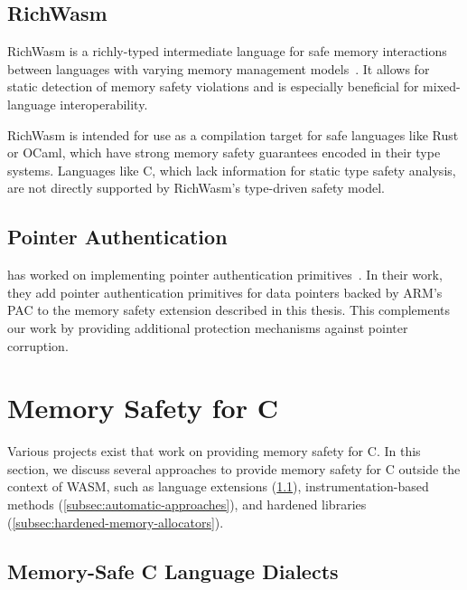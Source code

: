 \subsection{RichWasm}
\label{subsec:richwasm}

RichWasm is a richly-typed intermediate language for safe memory interactions between languages with varying memory management models~\cite{paraskevopoulou2024richwasm}.
It allows for static detection of memory safety violations and is especially beneficial for mixed-language interoperability.

RichWasm is intended for use as a compilation target for safe languages like Rust or OCaml, which have strong memory safety guarantees encoded in their type systems.
Languages like C, which lack information for static type safety analysis, are not directly supported by RichWasm's type-driven safety model.

\subsection{Pointer Authentication}
\label{subsec:related-pointer-authentication}

\citeauthor*{rehde2023wasm} has worked on implementing pointer authentication primitives~\cite{rehde2023wasm}.
In their work, they add pointer authentication primitives for data pointers backed by ARM's \ac{PAC} to the memory safety extension described in this thesis.
This complements our work by providing additional protection mechanisms against pointer corruption.

\section{Memory Safety for C}
\label{sec:related-memory-safety}

Various projects exist that work on providing memory safety for C.
In this section, we discuss several approaches to provide memory safety for C outside the context of \ac{WASM}, such as language extensions (\cref{subsec:extensions-to-the-c-language}), instrumentation-based methods (\cref{subsec:automatic-approaches}), and hardened libraries (\cref{subsec:hardened-memory-allocators}).

\subsection{Memory-Safe C Language Dialects}
\label{subsec:extensions-to-the-c-language}

